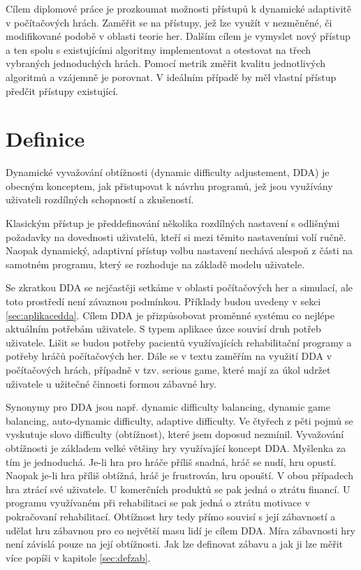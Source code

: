 Cílem diplomové práce je prozkoumat možnosti přístupů k dynamické adaptivitě v počítačových hrách. Zaměřit se na přístupy, jež lze využít v nezměněné, či modifikované podobě v oblasti teorie her. Dalším cílem je vymyslet nový přístup a ten spolu s existujícími algoritmy implementovat a otestovat na třech vybraných jednoduchých hrách. Pomocí metrik změřit kvalitu jednotlivých algoritmů a vzájemně je porovnat. V ideálním případě by měl vlastní přístup předčit přístupy existující.

\section{Definice}

Dynamické vyvažování obtížnosti (dynamic difficulty adjustement, DDA) je obecným konceptem, jak přistupovat k návrhu programů, jež jsou využívány uživateli rozdílných schopností a zkušeností. 

Klasickým přístup je předdefinování několika rozdílných nastavení s odlišnými požadavky na dovednosti uživatelů, kteří si mezi těmito nastaveními volí ručně. Naopak dynamický, adaptivní přístup volbu nastavení nechává alespoň z části na samotném programu, který se rozhoduje na základě modelu uživatele.

Se zkratkou DDA se nejčastěji setkáme v oblasti počítačových her a simulací, ale toto prostředí není závaznou podmínkou. Příklady budou uvedeny v sekci \ref{sec:aplikacedda}. Cílem DDA je přizpůsobovat proměnné systému co nejlépe aktuálním potřebám uživatele.  S typem aplikace úzce souvisí druh potřeb uživatele. Lišit se budou potřeby pacientů využívajících rehabilitační programy a potřeby hráčů počítačových her. Dále se v textu zaměřím na využití DDA v počítačových hrách, případně v tzv. serious game, které mají za úkol udržet uživatele u užitečné činnosti formou zábavné hry.

Synonymy pro DDA jsou např. dynamic difficulty balancing, dynamic game balancing, auto-dynamic difficulty, adaptive difficulty. Ve čtyřech z pěti pojmů se vyskutuje slovo difficulty (obtížnost), které jsem doposud nezmínil. Vyvažování obtížnosti je základem velké většiny hry využívající koncept DDA. Myšlenka za tím je jednoduchá. Je-li hra pro hráče příliš snadná, hráč se nudí, hru opustí. Naopak je-li hra příliš obtížná, hráč je frustrován, hru opouští. V obou případech hra ztrácí své uživatele. U komerčních produktů se pak jedná o ztrátu financí. U programu využívaném při rehabilitaci se pak jedná o ztrátu motivace v pokračovaní rehabilitací. Obtížnost hry tedy přímo souvisí s její zábavností a udělat hru zábavnou pro co největší masu lidí je cílem DDA. Míra zábavnosti hry není závislá pouze na její obtížnosti. Jak lze definovat zábavu a jak ji lze měřit více popíši v kapitole \ref{sec:defzab}. 

